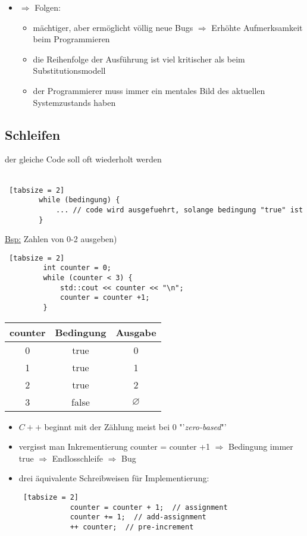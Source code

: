 \documentclass{article}
\begin{document}
\begin{itemize}
\begin{itemize}
\begin{lstlisting} [tabsize = 2]
 			\end{lstlisting}
 		\end{itemize}
 		\item $\Rightarrow$ Folgen:
 		\begin{itemize}
 			\item mächtiger, aber ermöglicht völlig neue Bugs $\Rightarrow$ Erhöhte Aufmerksamkeit beim Programmieren
 			\item die Reihenfolge der Ausführung ist viel kritischer als beim Substitutionsmodell
 			\item der Programmierer muss immer ein mentales Bild des aktuellen Systemzustands haben
 		\end{itemize}
 	\end{itemize}
	
	\subsection{Schleifen}
	 der gleiche Code soll oft wiederholt werden \\ \\
	 
	 \begin{lstlisting} [tabsize = 2]
	 	while (bedingung) {
		 	... // code wird ausgefuehrt, solange bedingung "true" ist
	 	}
	 \end{lstlisting}
	 \underline{Bsp:} Zahlen von 0-2 ausgeben)
	 \begin{lstlisting} [tabsize = 2]
		 int counter = 0;
		 while (counter < 3) {
			 std::cout << counter << "\n";
			 counter = counter +1;
		 }
	 \end{lstlisting}
	 
	 \begin{tabular} {c|c|c}
	 	counter & Bedingung & Ausgabe \\
	 	\hline
	 	0 & true & 0 \\
	 	1 & true & 1 \\
	 	2 & true & 2 \\
	 	3 & false & $\varnothing$
	 \end{tabular}
	 
	\begin{itemize}
		\item $C++$ beginnt mit der Zählung meist bei $0$ "'\textit{zero-based}"'
		\item vergisst man Inkrementierung counter = counter +1 $\Rightarrow$ Bedingung immer true $\Rightarrow$ Endlosschleife $\Rightarrow$ Bug
		\item drei äquivalente Schreibweisen für Implementierung:
		\begin{lstlisting} [tabsize = 2]
			counter = counter + 1;  // assignment
			counter += 1;  // add-assignment
			++ counter;  // pre-increment
		\end{lstlisting}
	\end{itemize}
	
\end{document}

